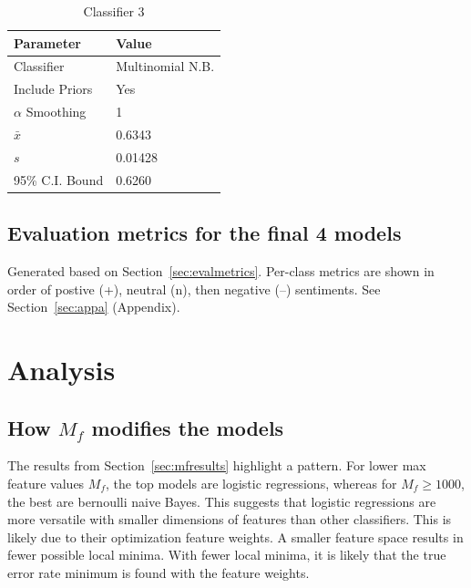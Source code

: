 \documentclass[11pt]{article}
\begin{document}
\begin{table}[H]
	\begin{center}
		\begin{tabular}{|l|l|}			
			\hline
			Parameter & Value \\
			\hline
			Classifier & Multinomial N.B. \\
			Include Priors & Yes \\
			$\alpha$ Smoothing & 1 \\
			\hline\hline
			$\bar{x}$ &  0.6343\\
			$s$ &   0.01428 \\
			95\% C.I. Bound & 0.6260 \\
			\hline
		\end{tabular}
		\caption{Classifier 3}
		\label{tbl:3rd10000}
	\end{center}
\end{table}

\subsection{Evaluation metrics for the final 4 models}

Generated based on Section~\ref{sec:evalmetrics}. 
Per-class metrics are shown in order of postive (+), neutral (n), then negative (--) sentiments.
See Section~\ref{sec:appa} (Appendix).

\section{Analysis}


\subsection{How $M_f$ modifies the models}\label{sec:mfanalysis}
The results from Section~\ref{sec:mfresults} highlight a pattern.
For lower max feature values $M_f$, the top models are logistic regressions,
whereas for $M_f \geq 1000$, the best are bernoulli naive Bayes. 
This suggests that logistic regressions are more versatile with smaller dimensions of features than other classifiers.
This is likely due to their optimization feature weights.
A smaller feature space results in fewer possible local minima.
With fewer local minima, it is likely that the true error rate minimum is found with the feature weights.
\end{document}
